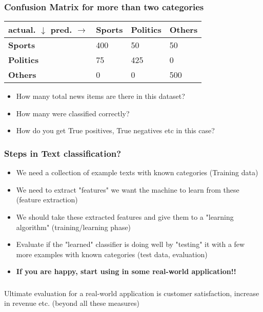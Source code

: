 \documentclass{beamer}
\begin{document}
\begin{frame}
\frametitle{Confusion Matrix for more than two categories}
\begin{table}[h]
\begin{center}
\begin{tabular}{llll|}
    actual. $\downarrow$ pred. $\rightarrow$&\textbf{Sports}&\textbf{Politics} & \textbf{Others}\\
    \hline
    \textbf{Sports}&400&50&50\\ \hline
    \textbf{Politics}&75&425&0\\ \hline
    \textbf{Others}&0&0&500\\
    \end{tabular}
    \end{center}
\end{table}
\begin{itemize}
\item How many total news items are there in this dataset? \pause
\item How many were classified correctly? \pause
\item How do you get True positives, True negatives etc in this case? 
\end{itemize}
\end{frame}

\begin{frame}
\frametitle{Steps in Text classification?}
\begin{itemize}
\item We need a collection of example texts with known categories (Training data)
\item We need to extract "features" we want the machine to learn from these (feature extraction)
\item We should take these extracted features and give them to a "learning algorithm" (training/learning phase)
\item Evaluate if the "learned" classifier is doing well by "testing" it with a few more examples with known categories (test data, evaluation)
\item \textbf{If you are happy, start using in some real-world application!!}
\end{itemize}
\end{frame}

\begin{frame}
\frametitle{}
Ultimate evaluation for a real-world application is customer satisfaction, increase in revenue etc. (beyond all these measures)
\end{frame}
\end{document}
